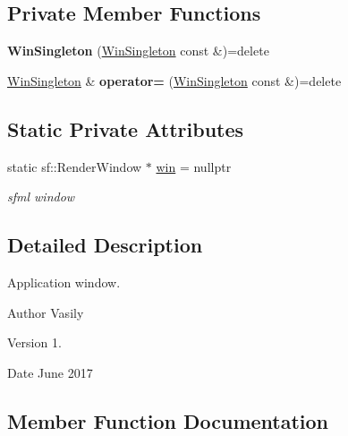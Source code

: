 \subsection*{Private Member Functions}
\begin{DoxyCompactItemize}
\item 
\mbox{\label{class_win_singleton_a8afac0ce148375d8e3d953e881891b53}} 
{\bfseries Win\+Singleton} (\hyperlink{class_win_singleton}{Win\+Singleton} const \&)=delete
\item 
\mbox{\label{class_win_singleton_a8585d53112439fe088484c9cbf8a26b6}} 
\hyperlink{class_win_singleton}{Win\+Singleton} \& {\bfseries operator=} (\hyperlink{class_win_singleton}{Win\+Singleton} const \&)=delete
\end{DoxyCompactItemize}
\subsection*{Static Private Attributes}
\begin{DoxyCompactItemize}
\item 
\mbox{\label{class_win_singleton_ad2469dc3ef435d5739cda832be2b556f}} 
static sf\+::\+Render\+Window $\ast$ \hyperlink{class_win_singleton_ad2469dc3ef435d5739cda832be2b556f}{win} = nullptr
\begin{DoxyCompactList}\small\item\em sfml window \end{DoxyCompactList}\end{DoxyCompactItemize}


\subsection{Detailed Description}
Application window. 

\begin{DoxyAuthor}{Author}
Vasily 
\end{DoxyAuthor}
\begin{DoxyVersion}{Version}
1. 
\end{DoxyVersion}
\begin{DoxyDate}{Date}
June 2017 
\end{DoxyDate}


\subsection{Member Function Documentation}
\mbox{\label{class_win_singleton_a82935bb60c8e4bb14350ac45813b33ca}} 
